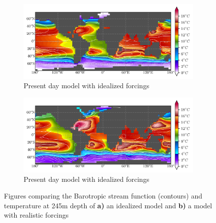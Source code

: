 \documentclass[a4paper]{article}
\begin{document}
\begin{figure}[H]
\begin{subfigure}{1\textwidth}
	\includegraphics[width=\linewidth]{compare/bsf_idealized}
	\caption{Present day model with idealized forcings}
\end{subfigure}
\begin{subfigure}{1\textwidth}
	\includegraphics[width=\linewidth]{compare/bsf_good_forcing}
	\caption{Present day model with idealized forcings}
\end{subfigure}
\caption{Figures comparing the Barotropic stream function (contours) and temperature at 245m depth of \textbf{a)} an idealized model and \textbf{b)} a model with realistic forcings}
\label{fig:bsf_compared}
\end{figure}

\begin{multicols}{2}




\end{multicols}
\end{document}
